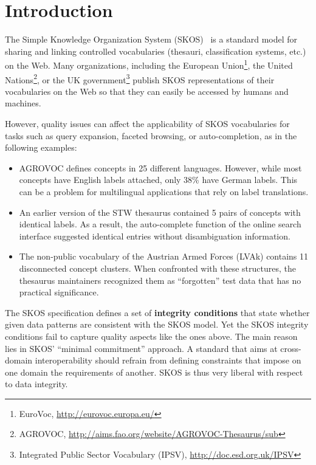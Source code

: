 
\section{Introduction}\label{sec:introduction}


The Simple Knowledge Organization System (SKOS)~\cite{SkosReference2008} is a standard model for sharing and linking controlled vocabularies (thesauri, classification systems, etc.) on the Web. Many organizations, including the European Union\footnote{EuroVoc, \url{http://eurovoc.europa.eu/}}, the United Nations\footnote{AGROVOC, \url{http://aims.fao.org/website/AGROVOC-Thesaurus/sub}}, or the UK government\footnote{Integrated Public Sector Vocabulary (IPSV), \url{http://doc.esd.org.uk/IPSV}} publish SKOS representations of their vocabularies on the Web so that they can easily be accessed by humans and machines.

However, quality issues can affect the applicability of SKOS vocabularies for tasks such as query expansion, faceted browsing, or auto-completion, as in the following examples: 

\begin{itemize}

	\item AGROVOC defines concepts in 25 different languages. However, while most concepts have English labels attached, only 38\% have German labels. This can be a problem for multilingual applications that rely on label translations.

	\item An earlier version of the STW thesaurus contained 5 pairs of concepts with identical labels. As a result, the auto-complete function of the online search interface suggested identical entries without disambiguation information.

	\item The non-public vocabulary of the Austrian Armed Forces (LVAk) contains 11 disconnected concept clusters. When confronted with these structures, the thesaurus maintainers recognized them as ``forgotten'' test data that has no practical significance.
	
\end{itemize}


The SKOS specification defines a set of \textbf{integrity conditions} that state whether given data patterns are consistent with the SKOS model. Yet the SKOS integrity conditions fail to capture quality aspects like the ones above. The main reason lies in SKOS' ``minimal commitment'' approach. A standard that aims at cross-domain interoperability should refrain from defining constraints that impose on one domain the requirements of another. SKOS is thus very liberal with respect to data integrity.

